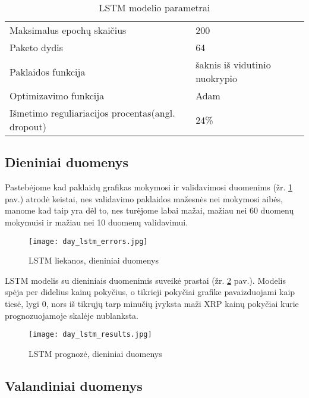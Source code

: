 \documentclass[12pt,a4paper]{article}
\begin{document}
\begin{table}[h!]
\begin{center}
\caption{LSTM modelio parametrai}
\begin{tabular}{ |p{9cm}|p{6cm}| }
 \hline
 Maksimalus epochų skaičius & 200 \\
 Paketo dydis & 64 \\
 Paklaidos funkcija & šaknis iš vidutinio nuokrypio \\
 Optimizavimo funkcija & Adam\\
 Išmetimo reguliariacijos procentas(angl. dropout) & 24\% \\
 \hline
\end{tabular}
\end{center}
\end{table}

\subsection{Dieniniai duomenys}

Pastebėjome kad paklaidų grafikas mokymosi ir validavimosi duomenims (žr. \ref{daylstmerrors} pav.) atrodė keistai, nes validavimo paklaidos mažesnės nei mokymosi aibės, manome kad taip yra dėl to, nes turėjome labai mažai, mažiau nei 60 duomenų mokymuisi ir mažiau nei 10 duomenų validavimui.

\begin{figure}[!h]
\centering
\caption{LSTM liekanos, dieniniai duomenys}
\label{daylstmerrors}
\texttt{[image: day\_lstm\_errors.jpg]}
\end{figure}

LSTM modelis su dieniniais duomenimis suveikė prastai (žr. \ref{daylstmpreds} pav.). Modelis spėja per didelius kainų pokyčius, o tikrieji pokyčiai grafike pavaizduojami kaip tiesė, lygi 0, nors iš tikrųjų tarp minučių įvyksta maži XRP kainų pokyčiai kurie prognozuojamoje skalėje nublanksta.
\clearpage

\begin{figure}[!h]
\centering
\caption{LSTM prognozė, dieniniai duomenys}
\label{daylstmpreds}
\texttt{[image: day\_lstm\_results.jpg]}
\end{figure}

\subsection{Valandiniai duomenys}
\end{document}
